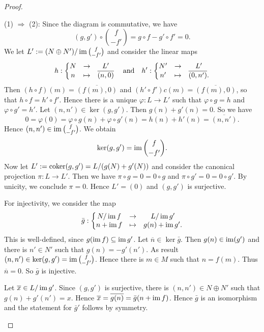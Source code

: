 \begin{proof}\
\begin{addmargin}[1cm]{0cm}

\hspace*{-1cm}(1) $\Rightarrow$ (2): Since the diagram is commutative, we have
\[
(g,g') \circ \binom{f}{-f'}
 = g \circ f - g' \circ f'
 = 0.
\]
%
We let $L':=(N\oplus N')/\operatorname{im} \binom{f}{-f'}$ and consider the linear maps
\[
h :
\left\{
\begin{matrix}
N & \to & L' \\
n & \mapsto & \overline{(n,0)}
\end{matrix}
\right.
\quad\text{and}\quad
h' :
\left\{
\begin{matrix}
N' & \to & L' \\
n' & \mapsto & \overline{(0,n')}.
\end{matrix}
\right.
\]
Then $(h\circ f)(m) = \overline{(f(m),0)}$ and $(h'\circ f')c(m) = \overline{(f(m),0)}$, so that $h\circ f=h'\circ f'$. Hence there is a unique $\varphi:L\to L'$ such that $\varphi\circ g =h$ and $\varphi\circ g' = h'$.
Let $(n,n')\in \ker(g,g')$. Then $g(n)+g'(n)=0$. So we have
\[
0 = \varphi(0) = \varphi\circ g(n) + \varphi\circ g'(n) = h(n) + h'(n) = \overline{(n,n')}. 
\]
Hence $(n,n')\in\operatorname{im} \binom{f}{-f'}$. We obtain
\[
\ker(g,g')=\operatorname{im} \binom{f}{-f'}.
\]
Now let $L':=\operatorname{coker}(g,g')=L/(g(N)+g'(N))$ and consider the canonical projection $\pi:L\to L'$. Then we have $\pi \circ g = 0 = 0 \circ g$ and $\pi \circ g' = 0 = 0 \circ g'$. By unicity, we conclude $\pi=0$. Hence $L'=(0)$ and $(g,g')$ is surjective.

For injectivity, we consider the map
\[
\bar g:
\left\{
\begin{matrix}
N/\operatorname{im} f & \to & L/\operatorname{im} g' \\
n + \operatorname{im} f & \mapsto & g(n) + \operatorname{im} g'.
\end{matrix}
\right.
\]
This is well-defined, since $g(\operatorname{im} f)\subseteq \operatorname{im} g'$. Let $\overline n \in \ker\bar g$. Then $g(n)\in \operatorname{im}(g')$ and there is $n'\in N'$ such that $g(n)=-g'(n')$. As result $(n,n')\in \ker(g,g')=\operatorname{im}\binom{f}{-f'}$. Hence there is $m\in M$ such that $n=f(m)$. Thus $\overline n = 0$. So $\bar g$ is injective.

Let $\overline x \in L/\operatorname{im} g'$. Since $(g,g')$ is surjective, there is $(n,n')\in N\oplus N'$ such that $g(n)+g'(n')=x$. Hence $\overline x = \overline{g(n)} = \bar g (n+\operatorname{im} f)$. Hence $\bar g$ is an isomorphism and the statement for $\bar g'$ follows by symmetry.


\end{addmargin}
\end{proof}
